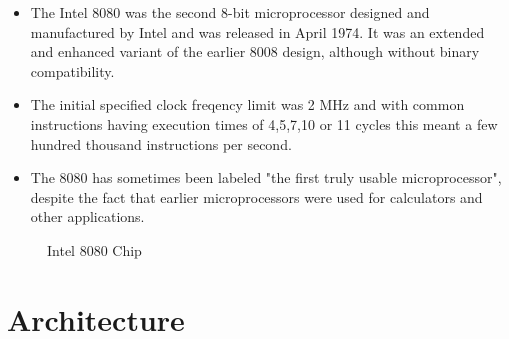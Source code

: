 \documentclass[conference]{IEEEtran}
\begin{document}
\begin{itemize}
\item The Intel 8080 was the second 8-bit microprocessor designed and manufactured by Intel and was released in April 1974. It was an extended and enhanced variant of the earlier 8008 design, although without binary compatibility.\\

\item The initial specified clock freqency limit was 2 MHz and with common instructions having execution times of 4,5,7,10 or 11 cycles this meant a few hundred thousand instructions per second.\\


\item  The 8080 has sometimes been labeled "the first truly usable microprocessor", despite the fact that earlier microprocessors were used for calculators and other applications.\\

\end{itemize}
\begin{figure}[!h]
\begin{center}
{}
\caption{Intel 8080 Chip}
\end{center}
\end{figure}

\section{
{\LARGE Architecture}}
\end{document}
